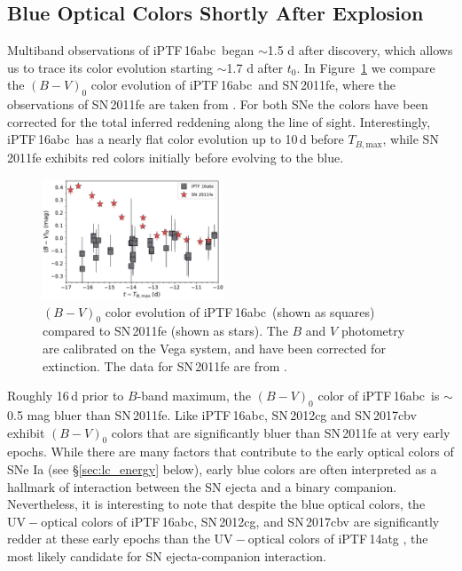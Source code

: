 \documentclass[twocolumn]{aastex61}
\newcommand{\abc}{iPTF\,16abc}
\begin{document}
\subsection{Blue Optical Colors Shortly After Explosion}

Multiband observations of \abc\ began $\sim$1.5 d after discovery, which allows us to trace its color evolution starting $\sim$1.7 d after $t_0$. In Figure~\ref{fig:B-Vcolors} we compare the $(B - V)_0$ color evolution of \abc\ and SN\,2011fe, where the observations of SN\,2011fe are taken from \citet{2016ApJ...820...67Z}. For both SNe the colors have been corrected for the total inferred reddening along the line of sight. Interestingly, \abc\ has a nearly flat color evolution up to 10\,d before $T_{B,\mathrm{max}}$, while SN\,2011fe exhibits red colors initially before evolving to the blue.

\begin{figure}[]
  \centering
  \includegraphics[width=0.48\textwidth]{16abc_11fe_colors.pdf}
  \caption{$(B - V)_0$ color evolution of \abc\ (shown as squares) 
    compared to SN\,2011fe (shown as stars). The $B$ and $V$ 
    photometry are calibrated on the Vega system, and have been 
    corrected for extinction. The data for 
    SN\,2011fe are from \citet{2016ApJ...820...67Z}.}
  \label{fig:B-Vcolors}
\end{figure}

Roughly 16\,d prior to $B$-band maximum, the $(B - V)_0$ color of \abc\ is $\sim$0.5 mag bluer than SN\,2011fe. Like \abc, SN\,2012cg \citep{2016ApJ...820...92M} and SN\,2017cbv \citep{2017arXiv170608990H} exhibit $(B - V)_0$ colors that are significantly bluer than SN\,2011fe at very early epochs. While there are many factors that contribute to the early optical colors of SNe Ia (see \S\ref{sec:lc_energy} below), early blue colors are often interpreted as a hallmark of interaction between the SN ejecta and a binary companion. Nevertheless, it is interesting to note that despite the blue optical colors, the $\mathrm{UV} - \mathrm{optical}$ colors of \abc, SN\,2012cg, and SN\,2017cbv are significantly redder at these early epochs than the $\mathrm{UV} - \mathrm{optical}$ colors of iPTF\,14atg \citep{2015Natur.521..328C}, the most likely candidate for SN ejecta-companion interaction. 
\end{document}
